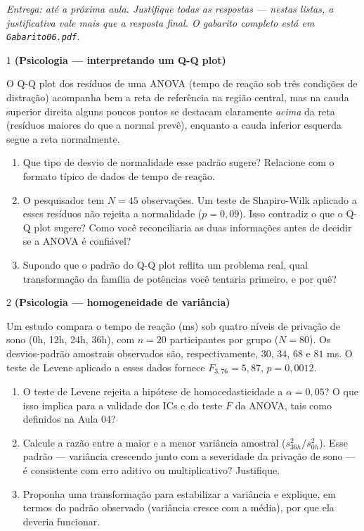 \documentclass[11pt]{article}
\begin{document}

\noindent \textit{Entrega: até a próxima aula. Justifique todas as respostas --- nestas listas, a
justificativa vale mais que a resposta final. O gabarito completo está em \texttt{Gabarito06.pdf}.}

\begin{questao}{1} \textbf{(Psicologia --- interpretando um Q-Q plot)}

O Q-Q plot dos resíduos de uma ANOVA (tempo de reação sob três condições de distração)
acompanha bem a reta de referência na região central, mas na cauda superior direita alguns
poucos pontos se destacam claramente \emph{acima} da reta (resíduos maiores do que a normal
prevê), enquanto a cauda inferior esquerda segue a reta normalmente.

\begin{enumerate}[label=(\alph*)]
  \item Que tipo de desvio de normalidade esse padrão sugere? Relacione com o formato típico de
    dados de tempo de reação.
  \item O pesquisador tem $N=45$ observações. Um teste de Shapiro-Wilk aplicado a esses resíduos
    não rejeita a normalidade ($p=0{,}09$). Isso contradiz o que o Q-Q plot sugere? Como você
    reconciliaria as duas informações antes de decidir se a ANOVA é confiável?
  \item Supondo que o padrão do Q-Q plot reflita um problema real, qual transformação da família
    de potências você tentaria primeiro, e por quê?
\end{enumerate}
\end{questao}

\begin{questao}{2} \textbf{(Psicologia --- homogeneidade de variância)}

Um estudo compara o tempo de reação (ms) sob quatro níveis de privação de sono (0h, 12h, 24h,
36h), com $n=20$ participantes por grupo ($N=80$). Os desvios-padrão amostrais observados são,
respectivamente, $30$, $34$, $68$ e $81$ ms. O teste de Levene aplicado a esses dados fornece
$F_{3,76} = 5{,}87$, $p = 0{,}0012$.

\begin{enumerate}[label=(\alph*)]
  \item O teste de Levene rejeita a hipótese de homocedasticidade a $\alpha=0{,}05$? O que isso
    implica para a validade dos ICs e do teste $F$ da ANOVA, tais como definidos na Aula 04?
  \item Calcule a razão entre a maior e a menor variância amostral ($s^2_{36h}/s^2_{0h}$). Esse
    padrão --- variância crescendo junto com a severidade da privação de sono --- é consistente
    com erro aditivo ou multiplicativo? Justifique.
  \item Proponha uma transformação para estabilizar a variância e explique, em termos do padrão
    observado (variância cresce com a média), por que ela deveria funcionar.
\end{enumerate}
\end{questao}
\end{document}
